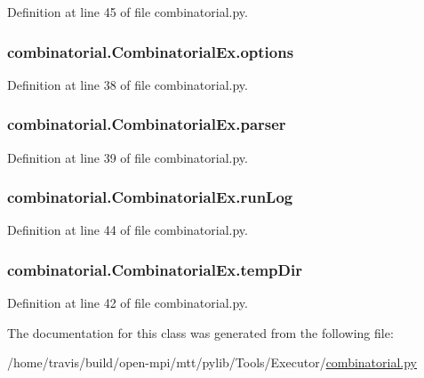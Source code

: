 Definition at line 45 of file combinatorial.\-py.

\hypertarget{classcombinatorial_1_1_combinatorial_ex_a20eda525b3947495bb6084c560dcca27}{
\subsubsection[{options}]{\setlength{\rightskip}{0pt plus 5cm}combinatorial.\-Combinatorial\-Ex.\-options}}\label{classcombinatorial_1_1_combinatorial_ex_a20eda525b3947495bb6084c560dcca27}


Definition at line 38 of file combinatorial.\-py.

\hypertarget{classcombinatorial_1_1_combinatorial_ex_ab5c27fece8991a34f47e85870637fc91}{
\subsubsection[{parser}]{\setlength{\rightskip}{0pt plus 5cm}combinatorial.\-Combinatorial\-Ex.\-parser}}\label{classcombinatorial_1_1_combinatorial_ex_ab5c27fece8991a34f47e85870637fc91}


Definition at line 39 of file combinatorial.\-py.

\hypertarget{classcombinatorial_1_1_combinatorial_ex_a3de3f7da4c201525da8452258df0bc7b}{
\subsubsection[{run\-Log}]{\setlength{\rightskip}{0pt plus 5cm}combinatorial.\-Combinatorial\-Ex.\-run\-Log}}\label{classcombinatorial_1_1_combinatorial_ex_a3de3f7da4c201525da8452258df0bc7b}


Definition at line 44 of file combinatorial.\-py.

\hypertarget{classcombinatorial_1_1_combinatorial_ex_a24b3bc621a8380e406bade192bc371d4}{
\subsubsection[{temp\-Dir}]{\setlength{\rightskip}{0pt plus 5cm}combinatorial.\-Combinatorial\-Ex.\-temp\-Dir}}\label{classcombinatorial_1_1_combinatorial_ex_a24b3bc621a8380e406bade192bc371d4}


Definition at line 42 of file combinatorial.\-py.



The documentation for this class was generated from the following file\-:\begin{DoxyCompactItemize}
\item 
/home/travis/build/open-\/mpi/mtt/pylib/\-Tools/\-Executor/\hyperlink{combinatorial_8py}{combinatorial.\-py}\end{DoxyCompactItemize}

